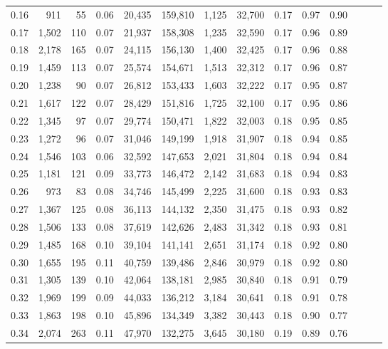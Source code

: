 \begin{tabular}{rrrrrrrrrrrrrr}
0.16 &    911 &   55 &  0.06 &   20,435 &  159,810 &   1,125 &  32,700 &  0.17 &  0.97 &      0.90 \\
0.17 &  1,502 &  110 &  0.07 &   21,937 &  158,308 &   1,235 &  32,590 &  0.17 &  0.96 &      0.89 \\
0.18 &  2,178 &  165 &  0.07 &   24,115 &  156,130 &   1,400 &  32,425 &  0.17 &  0.96 &      0.88 \\
0.19 &  1,459 &  113 &  0.07 &   25,574 &  154,671 &   1,513 &  32,312 &  0.17 &  0.96 &      0.87 \\
0.20 &  1,238 &   90 &  0.07 &   26,812 &  153,433 &   1,603 &  32,222 &  0.17 &  0.95 &      0.87 \\
0.21 &  1,617 &  122 &  0.07 &   28,429 &  151,816 &   1,725 &  32,100 &  0.17 &  0.95 &      0.86 \\
0.22 &  1,345 &   97 &  0.07 &   29,774 &  150,471 &   1,822 &  32,003 &  0.18 &  0.95 &      0.85 \\
0.23 &  1,272 &   96 &  0.07 &   31,046 &  149,199 &   1,918 &  31,907 &  0.18 &  0.94 &      0.85 \\
0.24 &  1,546 &  103 &  0.06 &   32,592 &  147,653 &   2,021 &  31,804 &  0.18 &  0.94 &      0.84 \\
0.25 &  1,181 &  121 &  0.09 &   33,773 &  146,472 &   2,142 &  31,683 &  0.18 &  0.94 &      0.83 \\
0.26 &    973 &   83 &  0.08 &   34,746 &  145,499 &   2,225 &  31,600 &  0.18 &  0.93 &      0.83 \\
0.27 &  1,367 &  125 &  0.08 &   36,113 &  144,132 &   2,350 &  31,475 &  0.18 &  0.93 &      0.82 \\
0.28 &  1,506 &  133 &  0.08 &   37,619 &  142,626 &   2,483 &  31,342 &  0.18 &  0.93 &      0.81 \\
0.29 &  1,485 &  168 &  0.10 &   39,104 &  141,141 &   2,651 &  31,174 &  0.18 &  0.92 &      0.80 \\
0.30 &  1,655 &  195 &  0.11 &   40,759 &  139,486 &   2,846 &  30,979 &  0.18 &  0.92 &      0.80 \\
0.31 &  1,305 &  139 &  0.10 &   42,064 &  138,181 &   2,985 &  30,840 &  0.18 &  0.91 &      0.79 \\
0.32 &  1,969 &  199 &  0.09 &   44,033 &  136,212 &   3,184 &  30,641 &  0.18 &  0.91 &      0.78 \\
0.33 &  1,863 &  198 &  0.10 &   45,896 &  134,349 &   3,382 &  30,443 &  0.18 &  0.90 &      0.77 \\
0.34 &  2,074 &  263 &  0.11 &   47,970 &  132,275 &   3,645 &  30,180 &  0.19 &  0.89 &      0.76 \\

\end{tabular}
